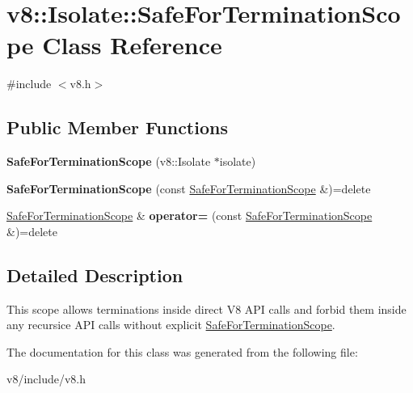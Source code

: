 \hypertarget{classv8_1_1Isolate_1_1SafeForTerminationScope}{}\section{v8\+:\+:Isolate\+:\+:Safe\+For\+Termination\+Scope Class Reference}
\label{classv8_1_1Isolate_1_1SafeForTerminationScope}


{\ttfamily \#include $<$v8.\+h$>$}

\subsection*{Public Member Functions}
\begin{DoxyCompactItemize}
\item 
\mbox{\label{classv8_1_1Isolate_1_1SafeForTerminationScope_aa68b3979df8fef65b1e7afa9cd9bba03}} 
{\bfseries Safe\+For\+Termination\+Scope} (v8\+::\+Isolate $\ast$isolate)
\item 
\mbox{\label{classv8_1_1Isolate_1_1SafeForTerminationScope_aa7041e87a889e8d4d8cdbca6b5adfa0d}} 
{\bfseries Safe\+For\+Termination\+Scope} (const \mbox{\hyperlink{classv8_1_1Isolate_1_1SafeForTerminationScope}{Safe\+For\+Termination\+Scope}} \&)=delete
\item 
\mbox{\label{classv8_1_1Isolate_1_1SafeForTerminationScope_ab4425468e50b70e5f0b8a7f438e609fa}} 
\mbox{\hyperlink{classv8_1_1Isolate_1_1SafeForTerminationScope}{Safe\+For\+Termination\+Scope}} \& {\bfseries operator=} (const \mbox{\hyperlink{classv8_1_1Isolate_1_1SafeForTerminationScope}{Safe\+For\+Termination\+Scope}} \&)=delete
\end{DoxyCompactItemize}


\subsection{Detailed Description}
This scope allows terminations inside direct V8 A\+PI calls and forbid them inside any recursice A\+PI calls without explicit \mbox{\hyperlink{classv8_1_1Isolate_1_1SafeForTerminationScope}{Safe\+For\+Termination\+Scope}}. 

The documentation for this class was generated from the following file\+:\begin{DoxyCompactItemize}
\item 
v8/include/v8.\+h\end{DoxyCompactItemize}
